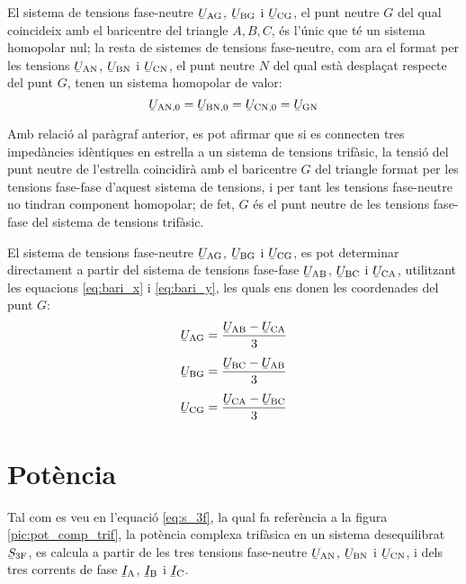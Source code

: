 El sistema de tensions fase-neutre
$\cmplx{U}\ped{AG}$, $\cmplx{U}\ped{BG}$ i $\cmplx{U}\ped{CG}$,
el punt neutre $G$ del qual coincideix amb el baricentre del
triangle $A, B,
 C$, és l'únic que té un sistema homopolar nul; la resta de sistemes de tensions
 fase-neutre, com ara el format per les tensions $\cmplx{U}\ped{AN}$, $\cmplx{U}\ped{BN}$ i $\cmplx{U}\ped{CN}$,
 el punt neutre $N$ del qual està desplaçat respecte del punt $G$, tenen un sistema
 homopolar de valor:
\begin{equation}
    \cmplx{U}\ped{AN,0} = \cmplx{U}\ped{BN,0} =
    \cmplx{U}\ped{CN,0} = \cmplx{U}\ped{GN}\label{eq:tens-hom}
\end{equation}

Amb relació al paràgraf anterior, es pot afirmar que si es
connecten tres impedàncies idèntiques en estrella a un sistema
de tensions trifàsic, la tensió del punt neutre de l'estrella
coincidirà amb el baricentre $G$ del triangle format per les tensions
fase-fase d'aquest sistema de tensions, i per tant les tensions fase-neutre no tindran
component homopolar; de fet, $G$ és el punt neutre de les tensions
fase-fase del sistema de tensions trifàsic.

El sistema de tensions fase-neutre
$\cmplx{U}\ped{AG}$, $\cmplx{U}\ped{BG}$ i $\cmplx{U}\ped{CG}$, es pot determinar directament a partir del sistema de tensions fase-fase $\cmplx{U}\ped{AB}$, $\cmplx{U}\ped{BC}$ i $\cmplx{U}\ped{CA}$, utilitzant les equacions \eqref{eq:bari_x} i \eqref{eq:bari_y}, les quals ens donen les coordenades del punt $G$:
\begin{subequations}
\begin{align}
    \cmplx{U}\ped{AG} &= \frac{\cmplx{U}\ped{AB}-\cmplx{U}\ped{CA}}{3}\label{eq:uag}\\[1ex]
    \cmplx{U}\ped{BG} &= \frac{\cmplx{U}\ped{BC}-\cmplx{U}\ped{AB}}{3}\label{eq:ubg}\\[1ex]
    \cmplx{U}\ped{CG} &= \frac{\cmplx{U}\ped{CA}-\cmplx{U}\ped{BC}}{3}\label{eq:ucg}
\end{align}
\end{subequations}

\section{Potència} 

Tal com es veu en l'equació \eqref{eq:s_3f}, la qual fa referència a
la figura \vref{pic:pot_comp_trif}, la potència complexa trifàsica
en un sistema desequilibrat $\cmplx{S}\ped{3F}$, es calcula a partir
de les tres tensions fase-neutre $\cmplx{U}\ped{AN}$,
$\cmplx{U}\ped{BN}$ i $\cmplx{U}\ped{CN}$, i dels tres
corrents de fase $\cmplx{I}\ped{A}$, $\cmplx{I}\ped{B}$ i
$\cmplx{I}\ped{C}$.


